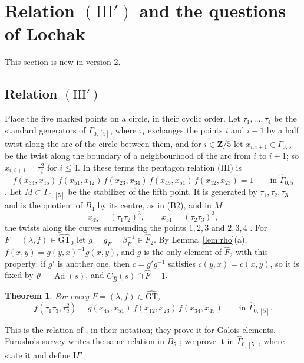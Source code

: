 \documentclass[11pt,a4paper]{article}
\theoremstyle{plain}
\newtheorem{theorem}{Theorem}
\theoremstyle{definition}
\theoremstyle{remark}
\newcommand{\GT}{\widehat{\mathrm{GT}}}
\newcommand{\GTz}{\widehat{\mathrm{GT}}_0}
\newcommand{\Z}{\mathbf Z}
\newcommand{\Fh}{\widehat F}
\newcommand{\Bh}{\widehat B}
\newcommand{\Gh}{\widehat\Gamma}
\newcommand{\Ad}{\operatorname{Ad}}
\begin{document}
\section{Relation \texorpdfstring{$(\mathrm{III}')$}{(III')} and the questions of Lochak}\label{sec:IIIp}

This section is new in version 2.

\subsection*{Relation $(\mathrm{III}')$}
Place the five marked points on a circle, in their cyclic order. Let $\tau_1,\dots,\tau_4$ be the standard
generators of $\Gamma_{0,[5]}$, where $\tau_i$ exchanges the points $i$ and $i+1$ by a half twist along the arc of the
circle between them, and for $i\in\Z/5$ let $x_{i,i+1}\in\Gamma_{0,5}$ be the twist along the boundary of a
neighbourhood of the arc from $i$ to $i+1$; so $x_{i,i+1}=\tau_i^2$ for $i\le4$. In these terms the pentagon relation
(III) is
\begin{equation}\label{eq:pentagon}
 f(x_{34},x_{45})\,f(x_{51},x_{12})\,f(x_{23},x_{34})\,f(x_{45},x_{51})\,f(x_{12},x_{23})=1
 \qquad\text{in }\Gh_{0,5}
\end{equation}
\cite[\S1]{NS}. Let $M\subset\Gamma_{0,[5]}$ be the stabilizer of the fifth point. It is generated by
$\tau_1,\tau_2,\tau_3$ and is the quotient of $B_4$ by its centre, as in (B2), and in $M$
\[
 x_{45}=(\tau_1\tau_2)^3,\qquad x_{51}=(\tau_2\tau_3)^3,
\]
the twists along the curves surrounding the points $1,2,3$ and $2,3,4$ \cite[\S1]{NS}. For $F=(\lambda,f)\in\GTz$
let $g=g_F=\beta_F^{-1}\in\Fh_2$. By Lemma~\ref{lem:rho}(a), $f(x,y)=g(y,x)^{-1}g(x,y)$, and $g$ is the only element
of $\Fh_2$ with this property: if $g'$ is another one, then $c=g'g^{-1}$ satisfies $c(y,x)=c(x,y)$, so it is fixed
by $\vartheta=\Ad(s)$, and $C_{\Bh}(s)\cap\Fh=1$.

\begin{theorem}\label{thm:IIIp}
For every $F=(\lambda,f)\in\GT$,
\[
 f(\tau_1\tau_3,\tau_2^2)=g(x_{45},x_{51})\,f(x_{12},x_{23})\,f(x_{34},x_{45})\qquad\text{in }\Gh_{0,[5]}.
 \tag{III$'$}
\]
\end{theorem}

This is the relation of \cite[Theorem 1.1]{NS}, in their notation; they prove it for Galois elements. Furusho's
survey writes the same relation in $\Bh_5$ \cite[p.~191]{Fu}; we prove it in $\Gh_{0,[5]}$, where \cite{NS} state it
and define $\mathrm{I}\Gamma$.
\end{document}

